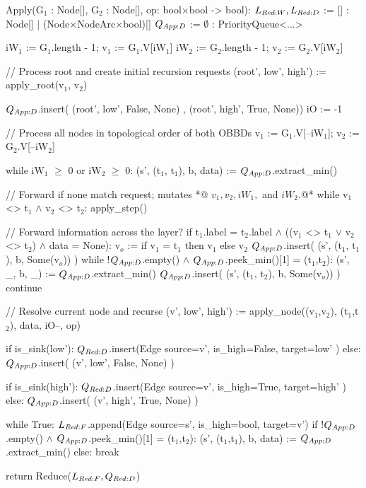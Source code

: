 \begin{blstlisting}
  Apply(G$_1$ : Node[], G$_2$ : Node[], op: bool$\times$bool ->    bool):
    $\ReduceLwork, \ReduceLdep$ := [] : Node[] | (Node$\times$NodeArc$\times$bool)[]
    $\ApplyQrec$ := $\emptyset$ : PriorityQueue<...>

    iW$_1$ := G$_1$.length - 1; v$_1$ := G$_1$.V[iW$_1$]
    iW$_2$ := G$_2$.length - 1; v$_2$ := G$_2$.V[iW$_2$]

    // Process root and create initial recursion requests
    (root', low', high') := apply_root(v$_1$, v$_2$)

    $\ApplyQrec$.insert( (root', low', False, None)
                , (root', high', True, None))
    iO := -1

    // Process all nodes in topological order of both OBBDs
    v$_1$ := G$_1$.V[--iW$_1$]; v$_2$ := G$_2$.V[--iW$_2$]

    while iW$_1$ $\geq$ 0 or iW$_2$ $\geq$ 0:
      (s', (t$_1$, t$_1$), b, data) := $\ApplyQrec$.extract_min()

      // Forward if none match request; mutates *@\color{gray} $v_1, v_2, \mathit{iW}_1,$ and $\mathit{iW}_2$.@*
      while v$_1$ <>  t$_1$ $\land$ v$_2$ <>   t$_2$: apply_step()

      // Forward information across the layer?
      if t$_1$.label = t$_2$.label $\land$ ((v$_1$ <>    t$_1$ $\lor$ v$_2$ <>   t$_2$) $\land$ data = None):
        v$_o$ :=  if v$_1$ = t$_1$ then v$_1$ else v$_2$
        $\ApplyQrec$.insert( (s', (t$_1$, t$_1$), b, Some(v$_o$)) )
        while !$\ApplyQrec$.empty() $\land$ $\ApplyQrec$.peek_min()[1] = (t$_1$,t$_2$):
          (s', _, b, _) := $\ApplyQrec$.extract_min()
          $\ApplyQrec$.insert( (s', (t$_1$, t$_2$), b, Some(v$_o$)) )
        continue

      // Resolve current node and recurse
      (v', low', high') := apply_node((v$_1$,v$_2$), (t$_1$,t$_2$), data, iO--, op)

      if is_sink(low'):
        $\ReduceQdep$.insert(Edge{ source=v', is_high=False, target=low' })
      else:
        $\ApplyQrec$.insert( (v', low', False, None) )

      if is_sink(high'):
        $\ReduceQdep$.insert(Edge{ source=v', is_high=True, target=high' })
      else:
        $\ApplyQrec$.insert( (v', high', True, None) )

      while True:
        $\ReduceLforward$.append(Edge{ source=s', is_high=bool, target=v'})
        if !$\ApplyQrec$.empty() $\land$ $\ApplyQrec$.peek_min()[1] = (t$_1$,t$_2$):
          (s', (t$_1$,t$_1$), b, data) := $\ApplyQrec$.extract_min()
        else: break

    return Reduce($\ReduceLforward, \ReduceQdep$)
\end{blstlisting}
